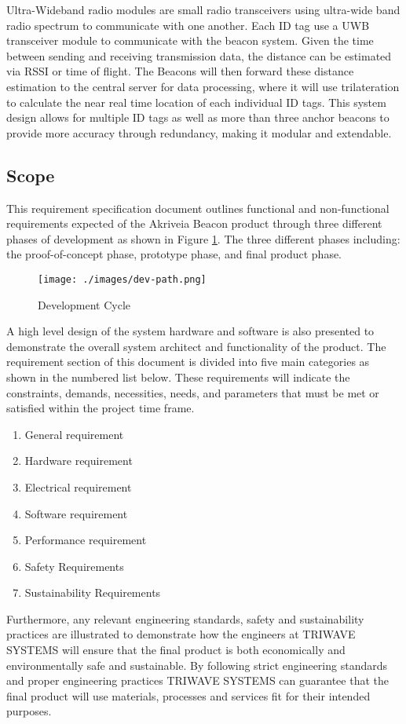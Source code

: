 \bigskip
Ultra-Wideband radio modules are small radio transceivers using ultra-wide band radio spectrum to communicate with one another. Each ID tag use a UWB transceiver module to communicate with the beacon system. Given the time between sending and receiving transmission data, the distance can be estimated via \Gls{RSSI} or time of flight. The Beacons will then forward these distance estimation to the central server for data processing, where it will use trilateration to calculate the near real time location of each individual ID tags. This system design allows for multiple ID tags as well as more than three anchor beacons to provide more accuracy through redundancy, making it modular and extendable.

\break

\subsection{Scope}
This requirement specification document outlines functional and non-functional requirements expected of the Akriveia Beacon product through three different phases of development as shown in Figure \ref{dev}. The three different phases including: the proof-of-concept phase, prototype phase, and final product phase.
\medskip

\begin{figure}[H]
\centering
    \texttt{[image: ./images/dev-path.png]}
    \caption{Development Cycle}
    \label{dev}
\end{figure}

A high level design of the system hardware and software is also presented to demonstrate the overall system architect and functionality of the product. The requirement section of this document is divided into five main categories as shown in the numbered list below. These requirements will indicate the constraints, demands, necessities, needs, and parameters that must be met or satisfied within the project time frame.

\begin{enumerate}
	\item General requirement 
	\item Hardware requirement 
	\item Electrical requirement 
	\item Software requirement 
	\item Performance requirement 
	\item Safety Requirements
	\item Sustainability  Requirements
\end{enumerate}
\medskip
Furthermore, any relevant engineering standards, safety and sustainability practices are illustrated to demonstrate how the engineers at TRIWAVE SYSTEMS will ensure that the final product is both economically and environmentally safe and sustainable. By following strict engineering standards and proper engineering practices TRIWAVE SYSTEMS can guarantee that the final product will use materials, processes and services fit for their intended purposes.

